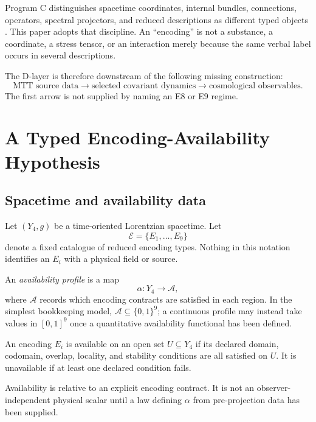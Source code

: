 \documentclass[11pt]{article}
\begin{document}
Program C distinguishes spacetime coordinates, internal bundles, connections,
operators, spectral projectors, and reduced descriptions as different typed
objects \cite{Nero2026ProgramC}.  This paper adopts that discipline.  An
``encoding'' is not a substance, a coordinate, a stress tensor, or an
interaction merely because the same verbal label occurs in several
descriptions.

The D-layer is therefore downstream of the following missing construction:
\[
\text{MTT source data}
\longrightarrow
\text{selected covariant dynamics}
\longrightarrow
\text{cosmological observables}.
\]
The first arrow is not supplied by naming an E8 or E9 regime.

\section{A Typed Encoding-Availability Hypothesis}

\subsection{Spacetime and availability data}

Let $(Y_4,g)$ be a time-oriented Lorentzian spacetime.  Let
\[
\mathcal E=\{E_1,\ldots,E_9\}
\]
denote a fixed catalogue of reduced encoding types.  Nothing in this notation
identifies an $E_i$ with a physical field or source.

\begin{definition}
An \emph{availability profile} is a map
\[
\alpha:Y_4\longrightarrow \mathcal A,
\]
where $\mathcal A$ records which encoding contracts are satisfied in each
region.  In the simplest bookkeeping model,
$\mathcal A\subseteq\{0,1\}^9$; a continuous profile may instead take values
in $[0,1]^9$ once a quantitative availability functional has been defined.
\end{definition}

\begin{definition}
An encoding $E_i$ is available on an open set $U\subseteq Y_4$ if its declared
domain, codomain, overlap, locality, and stability conditions are all satisfied
on $U$.  It is unavailable if at least one declared condition fails.
\end{definition}

\begin{remark}
Availability is relative to an explicit encoding contract.  It is not an
observer-independent physical scalar until a law defining $\alpha$ from
pre-projection data has been supplied.
\end{remark}
\end{document}
